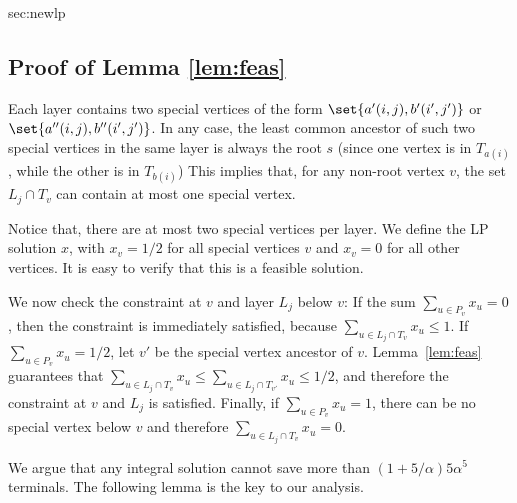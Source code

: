 \begin{appendixproof}{sec:newlp}{\subsection{Proof of Lemma \ref{lem:feas}}}
Each layer contains two special vertices of the form $\set{a'(i,j), b'(i',j')}$ or $\set{a''(i,j), b''(i',j')}$.
In any case, the least common ancestor of such two special vertices in the same layer is always the root $s$ (since one vertex is in $T_{a(i)}$, while the other is in $T_{b(i)}$)
This implies that, for any non-root vertex $v$, the set $L_j \cap T_v$ can contain at most one special vertex. 
\end{appendixproof}

Notice that, there are at most two special vertices per layer.  
We define the LP solution $x$, with $x_v =1/2$ for all special vertices $v$ and $x_v = 0$ for all other vertices. 
It is easy to verify that this is a feasible solution.  

We now check the constraint at $v$ and layer $L_j$ below $v$: If the sum $\sum_{u \in P_v} x_u = 0$, then the constraint is immediately satisfied, because $\sum_{ u \in L_j \cap T_v} x_u \leq 1$. 
If $\sum_{u \in P_v} x_u = 1/2$, let $v'$ be the special vertex ancestor of $v$. 
Lemma~\ref{lem:feas} guarantees that $\sum_{u \in L_j \cap T_v} x_u \leq \sum_{u \in L_j \cap T_{v'}} x_u \leq 1/2$, and therefore the constraint at $v$ and $L_j$ is satisfied. 
Finally, if $\sum_{u \in P_v} x_u = 1$, there can be no special vertex below $v$ and therefore $\sum_{u \in L_j \cap T_v} x_u = 0$.  

\vspace{0.1in} 

We argue that any integral solution cannot save more than $(1+5/\alpha) 5 \alpha^5$ terminals. The following lemma is the key to our analysis. 

